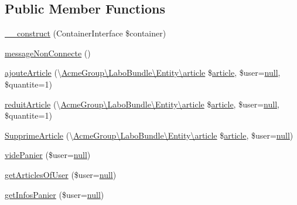 \subsection*{Public Member Functions}
\begin{DoxyCompactItemize}
\item 
\hyperlink{class_acme_group_1_1services_1_1entities_services_1_1panier_aebcbb31d1f155de0717619806b1260c4}{\+\_\+\+\_\+construct} (Container\+Interface \$container)
\item 
\hyperlink{class_acme_group_1_1services_1_1entities_services_1_1panier_a280e681f3427c5eddb644b3eeafdee00}{message\+Non\+Connecte} ()
\item 
\hyperlink{class_acme_group_1_1services_1_1entities_services_1_1panier_a32163c5db545f3292e8719c60944e357}{ajoute\+Article} (\textbackslash{}\hyperlink{class_acme_group_1_1_labo_bundle_1_1_entity_1_1article}{Acme\+Group\textbackslash{}\+Labo\+Bundle\textbackslash{}\+Entity\textbackslash{}article} \$\hyperlink{class_acme_group_1_1_labo_bundle_1_1_entity_1_1article}{article}, \$user=\hyperlink{validate_8js_afb8e110345c45e74478894341ab6b28e}{null}, \$quantite=1)
\item 
\hyperlink{class_acme_group_1_1services_1_1entities_services_1_1panier_a62880863339ed44c995a855b841c580c}{reduit\+Article} (\textbackslash{}\hyperlink{class_acme_group_1_1_labo_bundle_1_1_entity_1_1article}{Acme\+Group\textbackslash{}\+Labo\+Bundle\textbackslash{}\+Entity\textbackslash{}article} \$\hyperlink{class_acme_group_1_1_labo_bundle_1_1_entity_1_1article}{article}, \$user=\hyperlink{validate_8js_afb8e110345c45e74478894341ab6b28e}{null}, \$quantite=1)
\item 
\hyperlink{class_acme_group_1_1services_1_1entities_services_1_1panier_ae6df0a26df6558f85d0508569144b493}{Supprime\+Article} (\textbackslash{}\hyperlink{class_acme_group_1_1_labo_bundle_1_1_entity_1_1article}{Acme\+Group\textbackslash{}\+Labo\+Bundle\textbackslash{}\+Entity\textbackslash{}article} \$\hyperlink{class_acme_group_1_1_labo_bundle_1_1_entity_1_1article}{article}, \$user=\hyperlink{validate_8js_afb8e110345c45e74478894341ab6b28e}{null})
\item 
\hyperlink{class_acme_group_1_1services_1_1entities_services_1_1panier_ababc16c875d92d10df3a95afaa49fcad}{vide\+Panier} (\$user=\hyperlink{validate_8js_afb8e110345c45e74478894341ab6b28e}{null})
\item 
\hyperlink{class_acme_group_1_1services_1_1entities_services_1_1panier_a4a3ca532ddcb3318f85fcf3d535e2f40}{get\+Articles\+Of\+User} (\$user=\hyperlink{validate_8js_afb8e110345c45e74478894341ab6b28e}{null})
\item 
\hyperlink{class_acme_group_1_1services_1_1entities_services_1_1panier_acd839531b641982ed5f5fc486f845392}{get\+Infos\+Panier} (\$user=\hyperlink{validate_8js_afb8e110345c45e74478894341ab6b28e}{null})
\end{DoxyCompactItemize}
